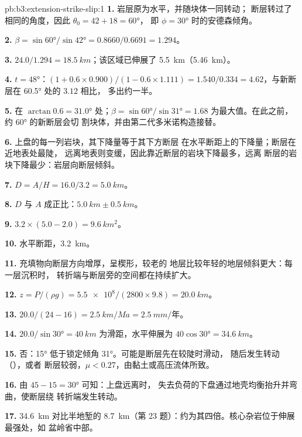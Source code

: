 \begin{solution}{pb:b3:extension-strike-slip:1}
\textbf{1.} 岩层原为水平，并随块体一同转动；
断层转过了相同的角度，因此 $\theta_0 = 42 + 18 = \ang{60}$，
即 $\phi = \ang{30}$ 时的安德森倾角。

\textbf{2.} $\beta = \sin\ang{60}/\sin\ang{42} = 0.8660/0.6691 = 1.294$。

\textbf{3.} $24.0/1.294 = \qty{18.5}{km}$；该区域已伸展了
\qty{5.5}{km}（\qty{5.46}{km}）。

\textbf{4.} $t = \ang{48}$：$(1 + 0.6\times0.900)/(1 - 0.6\times1.111) =
1.540/0.334 = 4.62$，与新断层在 \ang{60.5} 处的 $3.12$ 相比，
多出约一半。

\textbf{5.} 在 $\arctan0.6 = \ang{31.0}$ 处；$\beta = \sin\ang{60}/\sin\ang{31}
= 1.68$ 为最大值。在此之前，约 \ang{60} 的新断层会切
割块体，并由第二代多米诺构造接替。

\textbf{6.} 上盘的每一列岩块，其下降量等于其下方断层
在水平断距上的下降量；断层在近地表处最陡，
远离地表则变缓，因此靠近断层的岩块下降最多，远离
断层的岩块下降最少：岩层向断层倾斜。

\textbf{7.} $D = A/H = 16.0/3.2 = \qty{5.0}{km}$。

\textbf{8.} $D$ 与 $A$ 成正比：$\qty{5.0}{km} \pm \qty{0.5}{km}$。

\textbf{9.} $3.2\times(5.0 - 2.0) = \qty{9.6}{km^2}$。

\textbf{10.} 水平断距，\qty{3.2}{km}。

\textbf{11.} 充填物向断层方向增厚，呈楔形，较老的
地层比较年轻的地层倾斜更大：每一层沉积时，
转折端与断层旁的空间都在持续扩大。

\textbf{12.} $z = P/(\rho g) = \num{5.5e8}/(2800\times9.8) = \qty{20.0}{km}$。

\textbf{13.} $20.0/(24 - 16) = \qty{2.5}{km/Ma} = \qty{2.5}{mm/\text{年}}$。

\textbf{14.} $20.0/\sin\ang{30} = \qty{40}{km}$ 为滑距，水平伸展为 $40\cos\ang{30} =
\qty{34.6}{km}$。

\textbf{15.} 否：\ang{15} 低于锁定倾角 \ang{31}。可能是断层先在较陡时滑动，
随后发生转动（），或者
断层较弱，$\mu < 0.27$，由黏土或高压流体所致。

\textbf{16.} 由 $45 - 15 = \ang{30}$ 可知：上盘远离时，
失去负荷的下盘通过地壳均衡抬升并弯曲，使断层绕
转折端发生转动。

\textbf{17.} \qty{34.6}{km} 对比半地堑的 \qty{8.7}{km}（第
23 题）：约为其四倍。核心杂岩位于伸展最强处，如
盆岭省中部。


\end{solution}
